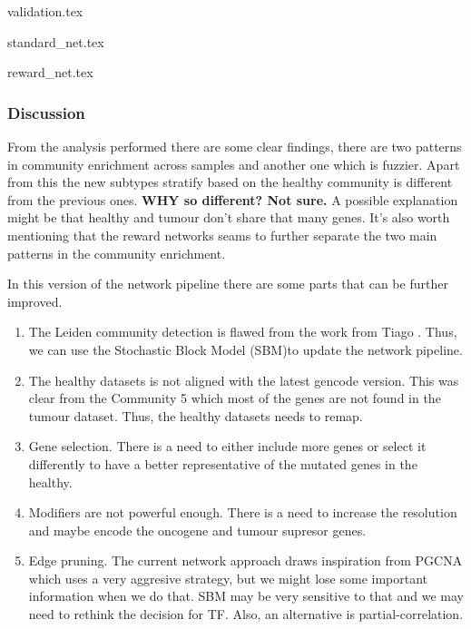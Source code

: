 {validation.tex}

{standard_net.tex}

{reward_net.tex}


\newpage

\subsubsection{Discussion}
From the analysis performed there are some clear findings, there are two patterns in community enrichment across samples and another one which is fuzzier. Apart from this the new subtypes stratify based on the healthy community is different from the previous ones. \textbf{WHY so different? Not sure.} A possible explanation might be that healthy and tumour don't share that many genes. It's also worth mentioning that the reward networks seams to further separate the two main patterns in the community enrichment.

In this version of the network pipeline there are some parts that can be further improved.
\begin{enumerate}
    \item The Leiden community detection is flawed from the work from Tiago \cite{Peixoto2021-jx,Fortunato2016-tj}. Thus, we can use the Stochastic Block Model (SBM)\cite{Peixoto2017-ua}to update the network pipeline.
    \item The healthy datasets is not aligned with the latest gencode version. This was clear from the Community 5 which most of the genes are not found in the tumour dataset. Thus, the healthy datasets needs to remap.
    \item Gene selection. There is a need to either include more genes or select it differently to have a better representative of the mutated genes in the healthy.
    \item Modifiers are not powerful enough. There is a need to increase the resolution and maybe encode the oncogene and tumour supresor genes.
    \item Edge pruning. The current network approach draws inspiration from PGCNA which uses a very aggresive strategy, but we might lose some important information when we do that. SBM may be very sensitive to that and we may need to rethink the decision for TF. Also, an alternative is partial-correlation.
\end{enumerate}


\newpage

